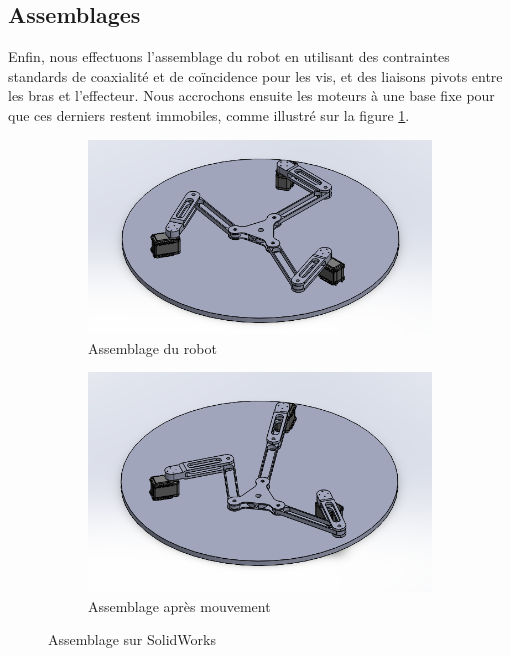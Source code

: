 \documentclass[a4paper, 11pt]{report}
\begin{document}
\subsection{Assemblages}

Enfin, nous effectuons l'assemblage du robot en utilisant des contraintes standards de coaxialité et de coïncidence pour les vis, et des liaisons pivots entre les bras et l'effecteur. Nous accrochons ensuite les moteurs à une base fixe pour que ces derniers restent immobiles, comme illustré sur la figure \ref{fig:assemblage}.

\begin{figure}[h]
    \centering
    \begin{subfigure}[t]{0.48\textwidth}
        \centering
        \includegraphics[width=\textwidth]{Figures/assemblage_1.png}
        \caption{Assemblage du robot}
    \end{subfigure}
    \hfill
    \begin{subfigure}[t]{0.48\textwidth}
        \centering
        \includegraphics[width=\textwidth]{Figures/assemblage_2.png}
        \caption{Assemblage après mouvement}
    \end{subfigure}
    \caption{Assemblage sur SolidWorks}
    \label{fig:assemblage}
\end{figure}
\end{document}
